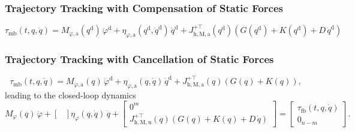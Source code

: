 \subsubsection{Trajectory Tracking with Compensation of Static Forces}
\begin{equation}
    \tau_\mathrm{mb}(t, q, \dot{q}) = M_{\varphi,\mathrm{a}}(q^\mathrm{d}) \, \ddot{\varphi}^\mathrm{d} + \eta_{\varphi,\mathrm{a}}(q^\mathrm{d},\dot{q}^\mathrm{d}) \, \dot{q}^\mathrm{d} + J_{\mathrm{h},\mathrm{M},\mathrm{a}}^{+\top}(q^\mathrm{d}) \left ( G(q^\mathrm{d}) + K(q^\mathrm{d}) + D \, \dot{q}^\mathrm{d} \right )
\end{equation}


\subsubsection{Trajectory Tracking with Cancellation of Static Forces}
\begin{equation}
    \tau_\mathrm{mb}(t, q, \dot{q}) = M_{\varphi,\mathrm{a}}(q) \, \ddot{\varphi}^\mathrm{d} + \eta_{\varphi,\mathrm{a}}(q,\dot{q}) \, \dot{q}^\mathrm{d} + J_{\mathrm{h},\mathrm{M},\mathrm{a}}^{+\top}(q) \left ( G(q) + K(q) \right ),
\end{equation}
leading to the closed-loop dynamics
\begin{equation}
    M_\varphi(q) \, \ddot{\varphi} + \begin{bmatrix}
        
    \end{bmatrix} \eta_\varphi(q,\dot{q}) \, \dot{q} + \begin{bmatrix}
        0^m\\ J_{\mathrm{h},\mathrm{M},\mathrm{u}}^{+\top}(q) \left ( G(q) + K(q) + D \, \dot{q} \right )
    \end{bmatrix} = \begin{bmatrix}
        \tau_\mathrm{fb}(t, q, \dot{q})\\ 0_{n-m}
    \end{bmatrix}.
\end{equation}





